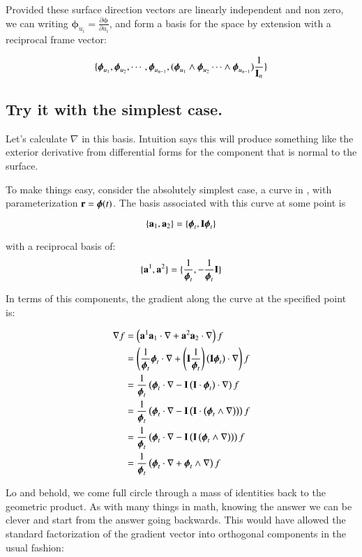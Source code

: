 \documentclass{article}      %
\newcommand{\grad}[0]{\nabla}
\newcommand{\vPhi}[0]{\boldsymbol{\phi}}
\begin{document}
Provided these surface direction vectors are linearly independent and non
zero, we can writing $\vPhi_{u_i} = \frac{\partial \vPhi}{ \partial u_i}$,
and form a basis for the space by extension with a reciprocal frame vector:

\[
\{ \vPhi_{u_1}, \vPhi_{u_2}, \cdots, \vPhi_{u_{n-1}}, 
(\vPhi_{u_1} \wedge \vPhi_{u_2} \cdots \wedge \vPhi_{u_{n-1}}) \inv{\BI_n}
 \}
\]

\subsection{ Try it with the simplest case. }

Let's calculate $\grad$ in this basis.  Intuition says this will
produce something like the exterior derivative from differential forms
for the component that is normal to the surface.

To make things easy, consider the absolutely simplest case, a curve
in , with parameterization $\Br = \vPhi(t)$.  The basis associated
with this curve at some point is

\[
\{ \Ba_1, \Ba_2 \} = \{ \vPhi_t, \BI \vPhi_t \}
\]

with a reciprocal basis of:
\[
\{ \Ba^1, \Ba^2 \} = \{ \inv{\vPhi_t}, -\inv{\vPhi_t} \BI \}
\]

In terms of this components, the gradient along the curve at the specified
point is:

\begin{align*}
\grad f
&= \left(\Ba^1 \Ba_1 \cdot \grad +\Ba^2 \Ba_2 \cdot \grad \right) f \\
&= \left(\inv{\vPhi_t} \vPhi_t \cdot \grad + \left( \BI \inv{\vPhi_t} \right) \left(\BI \vPhi_t \right) \cdot \grad \right) f \\
&= \inv{\vPhi_t}\left(\vPhi_t \cdot \grad -\BI \left(\BI \cdot \vPhi_t \right) \cdot \grad \right) f \\
&= \inv{\vPhi_t}\left(\vPhi_t \cdot \grad -\BI \left(\BI \cdot \left(\vPhi_t \wedge \grad \right) \right) \right) f \\
&= \inv{\vPhi_t}\left(\vPhi_t \cdot \grad -\BI \left(\BI \left(\vPhi_t \wedge \grad \right) \right) \right) f \\
&= \inv{\vPhi_t}\left(\vPhi_t \cdot \grad + \vPhi_t \wedge \grad \right) f \\
\end{align*}

Lo and behold, we come full circle through a mass of identities back to the geometric product.
As with many things in math, knowing the answer we can be clever and start from the answer going backwards.  This would have allowed the standard factorization of the gradient vector into 
orthogonal components in the usual fashion:
\end{document}

